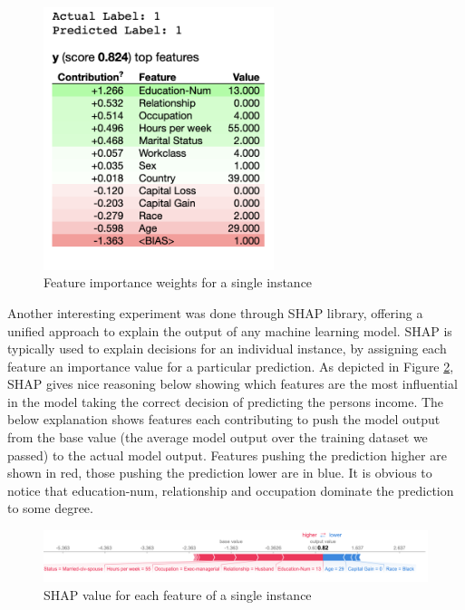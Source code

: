 \documentclass[runningheads]{llncs}
\begin{document}
	\begin{figure}
		\centering
		\includegraphics[width=0.6\textwidth]{img/individual_importance.png}
		\caption{Feature importance weights for a single instance}
		\label{fig:individual_importance}
	\end{figure}
	
	Another interesting experiment was done through SHAP library\cite{lundberg2017unified}, offering a unified approach to explain the output of any machine learning model. SHAP is typically used to explain decisions for an individual instance, by assigning each feature an importance value for a particular prediction. As depicted in Figure \ref{fig:shap}, SHAP gives nice reasoning below showing which features are the most influential in the model taking the correct decision of predicting the person\textquotesingle s income. The below explanation shows features each contributing to push the model output from the base value (the average model output over the training dataset we passed) to the actual model output. Features pushing the prediction higher are shown in red, those pushing the prediction lower are in blue. It is obvious to notice that education-num, relationship and occupation dominate the prediction to some degree. 
	
	\begin{figure}
		\centering
		\includegraphics[width=1.2\textwidth]{img/shap.png}
		\caption{SHAP value for each feature of a single instance}
		\label{fig:shap}
	\end{figure}
	
\end{document}
